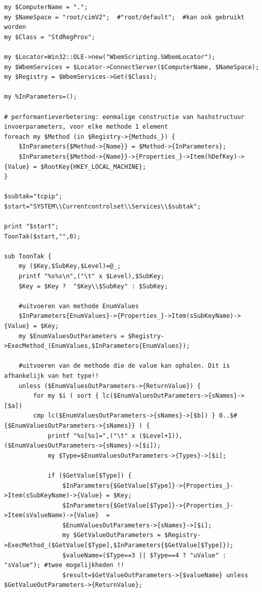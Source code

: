 \documentclass[11pt,a4paper]{report}
\begin{document}
\begin{enumerate}[resume]
\begin{lstlisting}
my $ComputerName = ".";
my $NameSpace = "root/cimV2";  #"root/default";  #kan ook gebruikt worden
my $Class = "StdRegProv";

my $Locator=Win32::OLE->new("WbemScripting.SWbemLocator");
my $WbemServices = $Locator->ConnectServer($ComputerName, $NameSpace);
my $Registry = $WbemServices->Get($Class);

my %InParameters=();

# performantieverbetering: eenmalige constructie van hashstructuur invoerparameters, voor elke methode 1 element
foreach my $Method (in $Registry->{Methods_}) {
	$InParameters{$Method->{Name}} = $Method->{InParameters};
	$InParameters{$Method->{Name}}->{Properties_}->Item(hDefKey)->{Value} = $RootKey{HKEY_LOCAL_MACHINE};
}

$subtak="tcpip";
$start="SYSTEM\\Currentcontrolset\\Services\\$subtak";

print "$start";
ToonTak($start,"",0);

sub ToonTak {
	my ($Key,$SubKey,$Level)=@_;
	printf "%s%s\n",("\t" x $Level),$SubKey;
	$Key = $Key ?  "$Key\\$SubKey" : $SubKey;
	
	#uitvoeren van methode EnumValues
	$InParameters{EnumValues}->{Properties_}->Item(sSubKeyName)->{Value} = $Key;
	my $EnumValuesOutParameters = $Registry->ExecMethod_(EnumValues,$InParameters{EnumValues});
	
	#uitvoeren van de methode die de value kan ophalen. Dit is afhankelijk van het type!!
	unless ($EnumValuesOutParameters->{ReturnValue}) {
		for my $i ( sort { lc($EnumValuesOutParameters->{sNames}->[$a])
		cmp lc($EnumValuesOutParameters->{sNames}->[$b]) } 0..$#{$EnumValuesOutParameters->{sNames}} ) {
			printf "%s[%s]=",("\t" x ($Level+1)),($EnumValuesOutParameters->{sNames}->[$i]);
			my $Type=$EnumValuesOutParameters->{Types}->[$i];
			
			if ($GetValue[$Type]) {
				$InParameters{$GetValue[$Type]}->{Properties_}->Item(sSubKeyName)->{Value} = $Key;
				$InParameters{$GetValue[$Type]}->{Properties_}->Item(sValueName)->{Value}  = 
				$EnumValuesOutParameters->{sNames}->[$i];
				my $GetValueOutParameters = $Registry->ExecMethod_($GetValue[$Type],$InParameters{$GetValue[$Type]});
				$valueName=($Type==3 || $Type==4 ? "uValue" : "sValue"); #twee mogelijkheden !!
				$result=$GetValueOutParameters->{$valueName} unless $GetValueOutParameters->{ReturnValue};
				

\end{lstlisting}
\end{enumerate}
\end{document}
